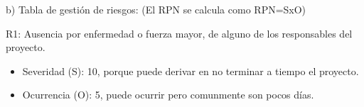 \documentclass[11pt]{charter}
\begin{document}
b) Tabla de gestión de riesgos:      (El RPN se calcula como RPN=SxO)

R1: Ausencia por enfermedad o fuerza mayor, de alguno de los responsables del proyecto.
\begin{itemize}
\item Severidad (S): 10, porque puede derivar en no terminar a tiempo el proyecto.
\item Ocurrencia (O): 5, puede ocurrir pero comunmente son pocos días.
\end{itemize}
\end{document}

